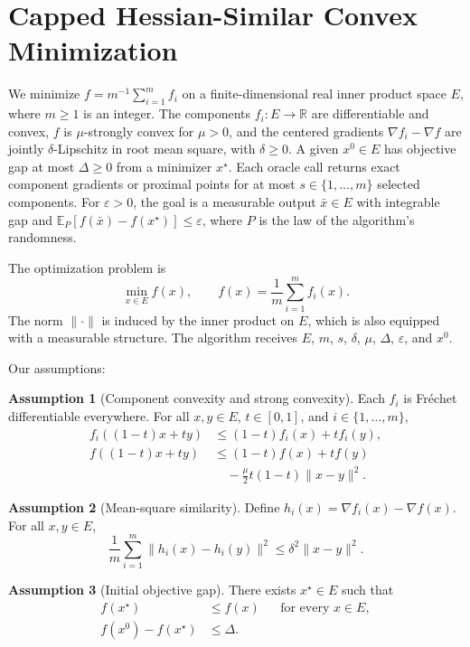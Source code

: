 \documentclass[10pt]{article}
\theoremstyle{definition}
\newtheorem{assumption}{Assumption}
\begin{document}
\section*{Capped Hessian-Similar Convex Minimization}
We minimize $f=m^{-1}\sum_{i=1}^m f_i$ on a finite-dimensional real inner product space $E$, where $m\geq1$ is an integer. The components $f_i:E\to\mathbb{R}$ are differentiable and convex, $f$ is $\mu$-strongly convex for $\mu>0$, and the centered gradients $\nabla f_i-\nabla f$ are jointly $\delta$-Lipschitz in root mean square, with $\delta\geq0$. A given $x^0\in E$ has objective gap at most $\Delta\geq0$ from a minimizer $x^\star$. Each oracle call returns exact component gradients or proximal points for at most $s\in\{1,\ldots,m\}$ selected components. For $\varepsilon>0$, the goal is a measurable output $\bar{x}\in E$ with integrable gap and $\mathbb{E}_{P}[f(\bar{x})-f(x^\star)]\leq\varepsilon$, where $P$ is the law of the algorithm's randomness.

The optimization problem is
\[
\min_{x\in E} f(x),
\qquad f(x)=\frac{1}{m}\sum_{i=1}^m f_i(x).
\]
The norm $\|\cdot\|$ is induced by the inner product on $E$, which is also equipped with a measurable structure. The algorithm receives $E$, $m$, $s$, $\delta$, $\mu$, $\Delta$, $\varepsilon$, and $x^0$.

Our assumptions:
\begin{assumption}[Component convexity and strong convexity]
Each $f_i$ is Fr\'echet differentiable everywhere. For all $x,y\in E$, $t\in[0,1]$, and $i\in\{1,\ldots,m\}$,
\[
\begin{aligned}
f_i((1-t)x+ty)&\leq (1-t)f_i(x)+t f_i(y),\\
f((1-t)x+ty)&\leq (1-t)f(x)+t f(y)\\
&\quad-\frac{\mu}{2}t(1-t)\|x-y\|^2.
\end{aligned}
\]
\end{assumption}

\begin{assumption}[Mean-square similarity]
Define $h_i(x)=\nabla f_i(x)-\nabla f(x)$. For all $x,y\in E$,
\[
\frac{1}{m}\sum_{i=1}^m\|h_i(x)-h_i(y)\|^2
\leq\delta^2\|x-y\|^2.
\]
\end{assumption}

\begin{assumption}[Initial objective gap]
There exists $x^\star\in E$ such that
\[
\begin{aligned}
f(x^\star)&\leq f(x) &&\text{for every }x\in E,\\
f(x^0)-f(x^\star)&\leq\Delta.
\end{aligned}
\]
\end{assumption}
\end{document}
